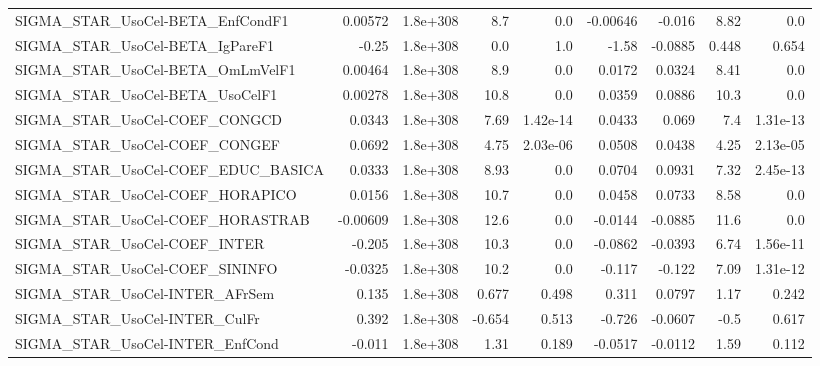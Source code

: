 \begin{tabular}{lrrrrrrrr}
SIGMA\_STAR\_UsoCel-BETA\_EnfCondF1      &     0.00572 &     1.8e+308 &     8.7 &      0.0 &   -0.00646 &      -0.016 &         8.82 &           0.0 \\
SIGMA\_STAR\_UsoCel-BETA\_IgPareF1       &       -0.25 &     1.8e+308 &     0.0 &      1.0 &      -1.58 &     -0.0885 &        0.448 &         0.654 \\
SIGMA\_STAR\_UsoCel-BETA\_OmLmVelF1      &     0.00464 &     1.8e+308 &     8.9 &      0.0 &     0.0172 &      0.0324 &         8.41 &           0.0 \\
SIGMA\_STAR\_UsoCel-BETA\_UsoCelF1       &     0.00278 &     1.8e+308 &    10.8 &      0.0 &     0.0359 &      0.0886 &         10.3 &           0.0 \\
SIGMA\_STAR\_UsoCel-COEF\_CONGCD         &      0.0343 &     1.8e+308 &    7.69 & 1.42e-14 &     0.0433 &       0.069 &          7.4 &      1.31e-13 \\
SIGMA\_STAR\_UsoCel-COEF\_CONGEF         &      0.0692 &     1.8e+308 &    4.75 & 2.03e-06 &     0.0508 &      0.0438 &         4.25 &      2.13e-05 \\
SIGMA\_STAR\_UsoCel-COEF\_EDUC\_BASICA    &      0.0333 &     1.8e+308 &    8.93 &      0.0 &     0.0704 &      0.0931 &         7.32 &      2.45e-13 \\
SIGMA\_STAR\_UsoCel-COEF\_HORAPICO       &      0.0156 &     1.8e+308 &    10.7 &      0.0 &     0.0458 &      0.0733 &         8.58 &           0.0 \\
SIGMA\_STAR\_UsoCel-COEF\_HORASTRAB      &    -0.00609 &     1.8e+308 &    12.6 &      0.0 &    -0.0144 &     -0.0885 &         11.6 &           0.0 \\
SIGMA\_STAR\_UsoCel-COEF\_INTER          &      -0.205 &     1.8e+308 &    10.3 &      0.0 &    -0.0862 &     -0.0393 &         6.74 &      1.56e-11 \\
SIGMA\_STAR\_UsoCel-COEF\_SININFO        &     -0.0325 &     1.8e+308 &    10.2 &      0.0 &     -0.117 &      -0.122 &         7.09 &      1.31e-12 \\
SIGMA\_STAR\_UsoCel-INTER\_AFrSem        &       0.135 &     1.8e+308 &   0.677 &    0.498 &      0.311 &      0.0797 &         1.17 &         0.242 \\
SIGMA\_STAR\_UsoCel-INTER\_CulFr         &       0.392 &     1.8e+308 &  -0.654 &    0.513 &     -0.726 &     -0.0607 &         -0.5 &         0.617 \\
SIGMA\_STAR\_UsoCel-INTER\_EnfCond       &      -0.011 &     1.8e+308 &    1.31 &    0.189 &    -0.0517 &     -0.0112 &         1.59 &         0.112 \\

\end{tabular}
